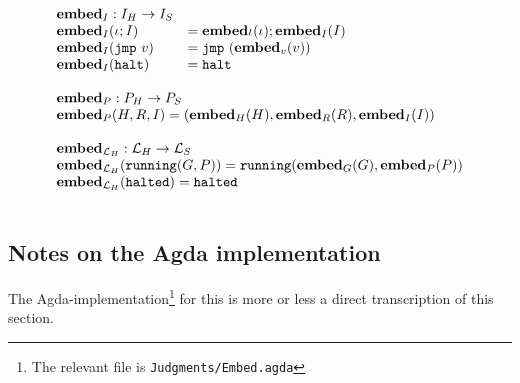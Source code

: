 {\[\begin{array}{l}
\begin{array}{ll}
{\ensuremath{\mathbf{embed}}}_I : {I_H} -> {I_S} \\
{\mathbf{embed}}_I(\iota ; I) &= {\mathbf{embed}}{\iota}(\iota) ; {\mathbf{embed}}_I(I) \\
{\mathbf{embed}}_I(\mathtt{jmp}\ v) &= \mathtt{jmp}\ ({\mathbf{embed}}_v(v)) \\
{\mathbf{embed}}_I(\mathtt{halt}) &= \mathtt{halt}
\end{array} \\\\

\begin{array}{l}
{\ensuremath{\mathbf{embed}}}_P : {P_H} -> {P_S} \\
{\mathbf{embed}}_P(H, R, I) = ({\mathbf{embed}}_H(H), {\mathbf{embed}}_R(R), {\mathbf{embed}}_I(I)) \\\\

{\mathbf{embed}}_{\mathcal{L}_H} : \mathcal{L}_H -> \mathcal{L}_S \\
{\mathbf{embed}}_{\mathcal{L}_H}(\mathtt{running}(G, P)) = \mathtt{running}({\mathbf{embed}}_G(G), {\mathbf{embed}}_P(P)) \\
{\mathbf{embed}}_{\mathcal{L}_H}(\mathtt{halted}) = \mathtt{halted} \\
\end{array} \\\\

\end{array}\]
}

\subsection{Notes on the Agda implementation}

The Agda-implementation\footnote{The relevant file is
  \texttt{Judgments/Embed.agda}} for this is more or less a direct transcription
of this section.
